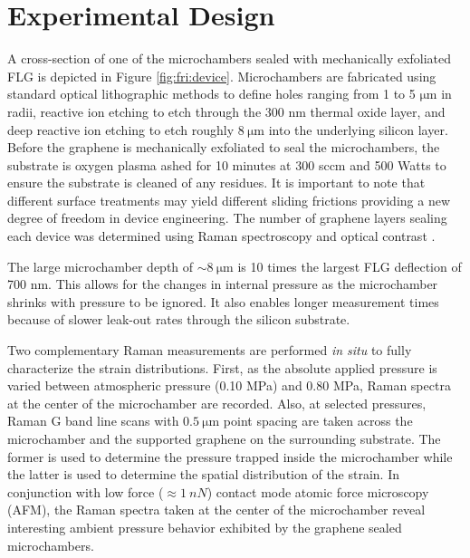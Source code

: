 \section{Experimental Design \label{sec:fri:Exp}}
A cross-section of one of the microchambers sealed with mechanically exfoliated FLG is depicted in Figure \ref{fig:fri:device}.
Microchambers are fabricated using standard optical lithographic methods to define holes ranging from 1 to 5 $\mathrm{\mu}$m in radii,  reactive ion etching to etch through the 300 nm thermal oxide layer, and deep reactive ion etching to etch roughly $8 \ \mathrm{\mu m}$ into the underlying silicon layer.
Before the graphene is mechanically exfoliated to seal the microchambers, the substrate is oxygen plasma ashed for 10 minutes at 300 sccm and 500 Watts to ensure the substrate is cleaned of any residues.
It is important to note that different surface treatments may yield different sliding frictions providing a new degree of freedom in device engineering. 
The number of graphene layers sealing each device was determined using Raman spectroscopy \cite{Ferrari2006} and optical contrast \cite{Blake2007,Casiraghi2007a}.

The large microchamber depth of $\sim 8 \ \mathrm{\mu m}$ is 10 times the largest FLG deflection of 700 nm.
This allows for the changes in internal pressure as the microchamber shrinks with pressure to be ignored.
It also enables longer measurement times because of slower leak-out rates through the silicon substrate.

Two complementary Raman measurements are performed \emph{in situ} to fully characterize the strain distributions.
First, as the absolute applied pressure is varied between atmospheric pressure (0.10 MPa) and 0.80 MPa, Raman spectra at the center of the microchamber are recorded.
Also, at selected pressures, Raman G band line scans with $ 0.5 \ \mathrm{\mu m}$ point spacing are taken across the microchamber and the supported graphene on the surrounding substrate.
The former is used to determine the pressure trapped inside the microchamber while the latter is used to determine the spatial distribution of the strain.
In conjunction with low force ($\approx 1 \ nN$) contact mode atomic force microscopy (AFM), the Raman spectra taken at the center of the microchamber reveal interesting ambient pressure behavior exhibited by the graphene sealed microchambers.

